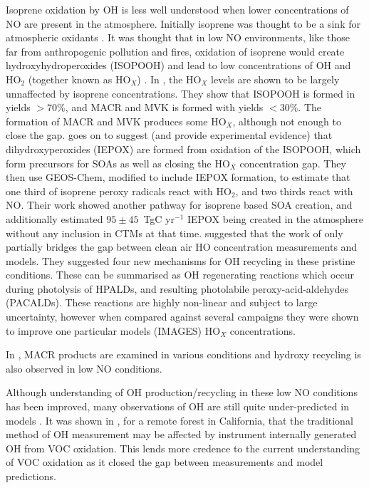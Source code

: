       Isoprene oxidation by OH is less well understood when lower concentrations of NO are present in the atmosphere.
      Initially isoprene was thought to be a sink for atmospheric oxidants \citep[e.g.][]{Guenther2000}.
      It was thought that in low NO environments, like those far from anthropogenic pollution and fires, oxidation of isoprene would create hydroxyhydroperoxides (ISOPOOH) and lead to low concentrations of OH and HO$_2$ (together known as HO$_X$) \citet{Paulot2009b}.
      In \citet{Paulot2009b}, the HO$_X$ levels are shown to be largely unnaffected by isoprene concentrations.
      They show that ISOPOOH is formed in yields $> 70\%$, and MACR and MVK is formed with yields $< 30\%$.
      The formation of MACR and MVK produces some HO$_X$, although not enough to close the gap.
      \citet{Paulot2009b} goes on to suggest (and provide experimental evidence) that dihydroxyperoxides (IEPOX) are formed from oxidation of the ISOPOOH, which form precursors for SOAs as well as closing the HO$_X$ concentration gap.
      They then use GEOS-Chem, modified to include IEPOX formation, to estimate that one third of isoprene peroxy radicals react with HO$_2$, and two thirds react with NO. 
      Their work showed another pathway for isoprene based SOA creation, and additionally estimated $95 \pm 45$~TgC yr$^{-1}$ IEPOX being created in the atmosphere without any inclusion in CTMs at that time.
      \citet{Peeters2010} suggested that the work of \citet{Paulot2009b} only partially bridges the gap between clean air HO concentration measurements and models.
      They suggested four new mechanisms for OH recycling in these pristine conditions. These can be summarised as OH regenerating reactions which occur during photolysis of HPALDs, and resulting photolabile peroxy-acid-aldehydes (PACALDs).
      These reactions are highly non-linear and subject to large uncertainty, however when compared against several campaigns they were shown to improve one particular models (IMAGES) HO$_X$ concentrations.
      
      In \cite{Crounse2012}, MACR products are examined in various conditions and hydroxy recycling is also observed in low NO conditions.
      
      Although understanding of OH production/recycling in these low NO conditions has been improved, many observations of OH are still quite under-predicted in models \citep{Mao2012}.
      It was shown in \citet{Mao2012}, for a remote forest in California, that the traditional method of OH measurement may be affected by instrument internally generated OH from VOC oxidation.
      This lends more credence to the current understanding of VOC oxidation as it closed the gap between measurements and model predictions.
      
